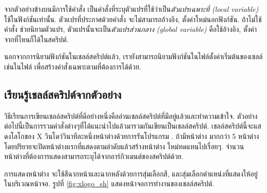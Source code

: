 \begin{thwbr}
\begin{MyExample}
\end{MyExample}%

จากตัวอย่างข้างบนมีการใช้คำสั่ง  เป็นคำสั่งที่ระบุตัวแปรที่ใช้ว่าเป็น\emph{ตัวแปรเฉพาะที่ (local variable)} ใช้ในฟังก์ชันเท่านั้น. ตัวแปรที่ประกาศด้วยคำสั่ง  จะไม่สามารถอ้างอิง, ตั้งค่าใหม่นอกฟังก์ชัน. ถ้าไม่ใช้คำสั่ง  ช่วยนิยามตัวแปร, ตัวแปรนั้นจะเป็น\emph{ตัวแปรส่วนกลาง (global variable)} คือใช้อ้างอิง, ตั้งค่าจากที่ไหนก็ได้ในสคริปต์. 

นอกจากการนิยามฟังก์ชันในเชลล์สคริปต์แล้ว, เรายังสามารถนิยามฟังก์ชันในไฟล์ตั้งค่าเริ่มต้นของเชลล์เช่นในไฟล์  เพื่อสร้างคำสั่งเฉพาะตามที่ต้องการได้ด้วย.

\subsection{เรียนรู้เชลล์สคริปต์จากตัวอย่าง}
วิธีเรียนการเขียนเชลล์สคริปต์ที่ดีอย่างหนึ่งคืออ่านเชลล์สคริปต์ที่มีอยู่แล้วและทำความเข้าใจ. ตัวอย่างต่อไปนี้เป็นการรวมคำสั่งต่างๆที่ได้แนะนำไปแล้วมารวมกันเขียนเป็นเชลล์สคริปต์. เชลล์สคริปต์นี้จะแสดงโลโกของ X วินโดว์วินาทีละหนึ่งหน้าต่างด้วยการรันโปรแกรม . ถ้ามีหน้าต่าง  มากกว่า 5 หน้าต่างโดยปริยายจะปิดหน้าต่างแรกที่แสดงตามลำดับแล้วสร้างหน้าต่าง  ใหม่ทดแทนไปเรื่อยๆ. จำนวนหน้าต่างที่ต้องการแสดงสามารถระบุได้จากอาร์กิวเมนต์ของสคริปต์ด้วย. 

การแสดงหน้าต่าง  จะใช้สีฉากหน้าและฉากหลังด้วยการสุ่มเลือกสี, และสุ่มเลือกตำแหน่งที่แสดงให้อยู่ในบริเวณหน้าจอ. รูปที่ \ref{fig:xlogo_sh} แสดงหน้าจอการทำงานของเชลล์สคริปต์.

\begin{figure}[!htb]
\end{figure}


\end{thwbr}

